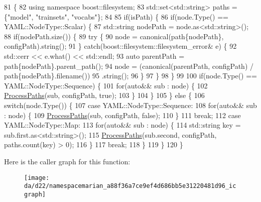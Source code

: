 \begin{DoxyCode}
81                                \{
82   \textcolor{keyword}{using namespace }boost::filesystem;
83   std::set<std::string> paths = \{\textcolor{stringliteral}{"model"}, \textcolor{stringliteral}{"trainsets"}, \textcolor{stringliteral}{"vocabs"}\};
84 
85   \textcolor{keywordflow}{if}(isPath) \{
86     \textcolor{keywordflow}{if}(node.Type() == YAML::NodeType::Scalar) \{
87       std::string nodePath = node.as<std::string>();
88       \textcolor{keywordflow}{if}(nodePath.size()) \{
89         \textcolor{keywordflow}{try} \{
90           node = canonical(path\{nodePath\}, configPath).\textcolor{keywordtype}{string}();
91         \} \textcolor{keywordflow}{catch}(boost::filesystem::filesystem\_error& e) \{
92           std::cerr << e.what() << std::endl;
93           \textcolor{keyword}{auto} parentPath = path\{nodePath\}.parent\_path();
94           node = (canonical(parentPath, configPath) / path\{nodePath\}.filename())
95                      .\textcolor{keywordtype}{string}();
96         \}
97       \}
98     \}
99 
100     \textcolor{keywordflow}{if}(node.Type() == YAML::NodeType::Sequence) \{
101       \textcolor{keywordflow}{for}(\textcolor{keyword}{auto}&& sub : node) \{
102         \hyperlink{namespacemarian_a88f36a7ce9ef4d686bb5e31220481d96}{ProcessPaths}(sub, configPath, \textcolor{keyword}{true});
103       \}
104     \}
105   \} \textcolor{keywordflow}{else} \{
106     \textcolor{keywordflow}{switch}(node.Type()) \{
107       \textcolor{keywordflow}{case} YAML::NodeType::Sequence:
108         \textcolor{keywordflow}{for}(\textcolor{keyword}{auto}&& sub : node) \{
109           \hyperlink{namespacemarian_a88f36a7ce9ef4d686bb5e31220481d96}{ProcessPaths}(sub, configPath, \textcolor{keyword}{false});
110         \}
111         \textcolor{keywordflow}{break};
112       \textcolor{keywordflow}{case} YAML::NodeType::Map:
113         \textcolor{keywordflow}{for}(\textcolor{keyword}{auto}&& sub : node) \{
114           std::string key = sub.first.as<std::string>();
115           \hyperlink{namespacemarian_a88f36a7ce9ef4d686bb5e31220481d96}{ProcessPaths}(sub.second, configPath, paths.count(key) > 0);
116         \}
117         \textcolor{keywordflow}{break};
118     \}
119   \}
120 \}
\end{DoxyCode}


Here is the caller graph for this function\+:
\nopagebreak
\begin{figure}[H]
\begin{center}
\leavevmode
\texttt{[image: da/d22/namespacemarian\_a88f36a7ce9ef4d686bb5e31220481d96\_icgraph]}
\end{center}
\end{figure}


